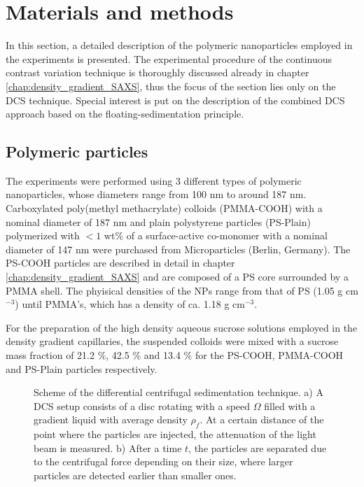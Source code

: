 \section{Materials and methods}
\label{sec:MaterialsMethods}
In this section, a detailed description of the polymeric nanoparticles employed in the experiments is presented. The experimental procedure of the continuous contrast variation technique is thoroughly discussed already in chapter \ref{chap:density_gradient_SAXS}, thus the focus of the section lies only on the DCS technique. Special interest is put on the description of the combined DCS approach based on the floating-sedimentation principle.


\subsection{Polymeric particles}

The experiments were performed using 3 different types of polymeric nanoparticles, whose diameters range from 100 nm to around 187 nm. Carboxylated poly(methyl methacrylate) colloids (PMMA-COOH) with a nominal diameter of 187 nm and plain polystyrene particles (PS-Plain) polymerized with $<1$ wt$\%$ of a surface-active co-monomer with a nominal diameter of 147 nm were purchased from Microparticles (Berlin, Germany). The PS-COOH particles are described in detail in chapter \ref{chap:density_gradient_SAXS} and are composed of a PS core surrounded by a PMMA shell. The phyisical densities of the NPs range from that of PS (1.05 g cm$^{-3}$) until PMMA's, which has a density of ca. 1.18 g cm$^{-3}$.

For the preparation of the high density aqueous sucrose solutions employed in the density gradient capillaries, the suspended colloids were mixed with a sucrose mass fraction of 21.2 $\%$, 42.5 $\%$ and 13.4 $\%$ for the PS-COOH, PMMA-COOH and PS-Plain particles respectively.

\begin{figure*}%
\centering
{}
\qquad
{}
\caption[Scheme of the differential centrifugal sedimentation setup.]{Scheme of the differential centrifugal sedimentation technique. a) A DCS setup consists of a disc rotating with a speed $\Omega$ filled with a gradient liquid with average density $\rho_f$. At a certain distance of the point where the particles are injected, the attenuation of the light beam is measured. b) After a time $t$, the particles are separated due to the centrifugal force depending on their size, where larger particles are detected earlier than smaller ones.}
\end{figure*}

